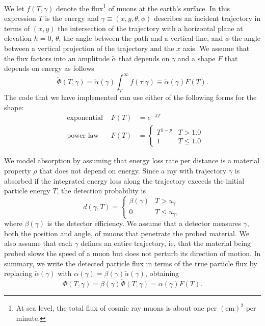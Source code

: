 \documentclass[twocolumn]{article}
\newcommand{\power}{p}
\begin{document}
We let $f(T,\gamma)$ denote the flux\footnote{At sea level, the total
  flux of cosmic ray muons is about one per $(\text{cm})^2$ per
  minute.} of muons at the earth's surface.  In this expression $T$ is
the energy and $\gamma\equiv(x,y,\theta,\phi)$ describes an incident
trajectory in terms of $(x,y)$ the intersection of the trajectory with
a horizontal plane at elevation $h=0$, $\theta$, the angle between the
path and a vertical line, and $\phi$ the angle between a vertical
projection of the trajectory and the $x$ axis.  We assume that the flux
factors into an amplitude $\tilde \alpha$ that depends on $\gamma$ and
a shape $F$ that depends on energy as follows
\begin{equation*}
  \tilde \Phi(T,\gamma) = \tilde \alpha(\gamma) \int_T^\infty
  f(\tau|\gamma) \equiv \tilde \alpha(\gamma) F(T).
\end{equation*}
The code that we have implemented can use either of the following forms
for the shape:
\begin{subequations}
  \label{eq:F}
  \begin{align}
    \label{eq:expF}
    & \text{exponential } & F(T) &=  e^{-\lambda T} \\
    \label{eq:PLF}
    & \text{power law } & F(T) &=
    \begin{cases}
      T^{1-\power} & T > 1.0 \\
      1 &  T \leq 1.0
    \end{cases}
  \end{align}
\end{subequations}

We model absorption by assuming that energy loss rate per distance is a
material property $\rho$ that does not depend on energy.  Since a ray
with trajectory $\gamma$ is absorbed if the integrated energy loss
along the trajectory exceeds the initial particle energy $T$, the
detection probability is
\begin{equation*}
  d(\gamma,T) =
  \begin{cases}
    \beta(\gamma) & T > u_\gamma \\
    0 & T \leq  u_\gamma,
  \end{cases}
\end{equation*}
where $\beta(\gamma)$ is the detector efficiency.  We assume that a
detector measures $\gamma$, both the position and angle, of muons that
penetrate the probed material.  We also assume that each $\gamma$
defines an entire trajectory, ie, that the material being probed slows
the speed of a muon but does not perturb its direction of motion.  In
summary, we write the detected particle flux in terms of the true
particle flux by replacing $\tilde \alpha(\gamma)$ with
$\alpha(\gamma)=\beta(\gamma)\tilde \alpha(\gamma)$, obtaining
\begin{equation*}
  \Phi(T,\gamma) = \beta(\gamma)\tilde\Phi(T,\gamma) =
  \alpha(\gamma)F(T).
\end{equation*}
\end{document}
